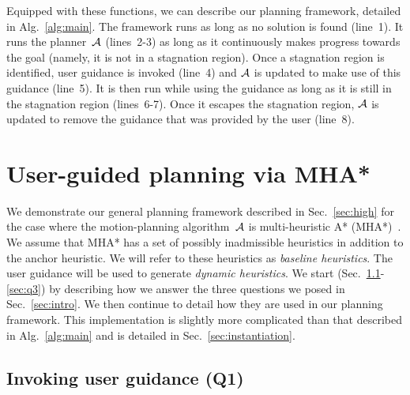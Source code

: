 \documentclass{article}
\begin{document}
Equipped with these functions, we can describe our planning framework, detailed in Alg.~\ref{alg:main}.
The framework runs as long as no solution is found (line~1).
It runs the planner~$\mathcal{A}$ (lines~2-3) as long as it continuously makes progress towards the goal (namely, it is not in a stagnation region).
Once a stagnation region is identified, user guidance is invoked (line~4) and $\mathcal{A}$  is updated to make use of this guidance (line~5).
It is then run while using the guidance as long as it is still in the stagnation region (lines~6-7).
Once it escapes the stagnation region, $\mathcal{A}$ is updated to remove the guidance that was provided by the user (line~8).


\section{User-guided planning via MHA*}
\label{sec:planning}

We demonstrate our general planning framework described in Sec.~\ref{sec:high} for the case where the motion-planning algorithm~$\mathcal{A}$ is multi-heuristic A* (MHA*)~\cite{ASNHL16}.
We assume that MHA* has a set of possibly inadmissible heuristics in addition to the anchor heuristic. We will refer to these heuristics as \emph{baseline heuristics}.
The user guidance will be used to generate \emph{dynamic heuristics}.
We start (Sec.~\ref{sec:q1}-\ref{sec:q3}) by describing how we answer the three questions we posed in Sec.~\ref{sec:intro}.
We then continue to detail how they are used in our planning framework.
This implementation is slightly more complicated than that described in Alg.~\ref{alg:main} and is detailed in Sec.~\ref{sec:instantiation}.

\subsection{Invoking user guidance (Q1)}
\label{sec:q1}
\end{document}
